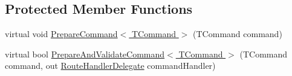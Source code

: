 \subsection*{Protected Member Functions}
\begin{DoxyCompactItemize}
\item 
virtual void \hyperlink{classCqrs_1_1Akka_1_1Commands_1_1AkkaCommandBus_a9755a84c0b971ce0862abdc2783422ce_a9755a84c0b971ce0862abdc2783422ce}{Prepare\+Command$<$ T\+Command $>$} (T\+Command command)
\item 
virtual bool \hyperlink{classCqrs_1_1Akka_1_1Commands_1_1AkkaCommandBus_ae3e5f1725bceb0359aedb74ded530858_ae3e5f1725bceb0359aedb74ded530858}{Prepare\+And\+Validate\+Command$<$ T\+Command $>$} (T\+Command command, out \hyperlink{classCqrs_1_1Bus_1_1RouteHandlerDelegate}{Route\+Handler\+Delegate} command\+Handler)
\end{DoxyCompactItemize}
